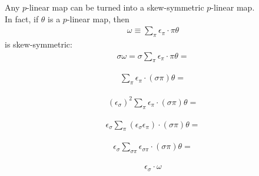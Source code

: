 \documentclass[12pt,a4paper]{article}
\begin{document}
\hspace{1cm} Any $p$-linear map can be turned into a skew-symmetric $p$-linear map.\\ In
fact, if $\theta$ is a $p$-linear map, then
\begin{align*}
\omega \equiv \sum_\pi \epsilon_\pi \cdot \pi \theta
\end{align*}
is skew-symmetric:
\begin{align*}
\sigma \omega = \sigma \sum_\pi \epsilon_\pi \cdot \pi \theta =
\end{align*}

\begin{align*}
 \sum_\pi \epsilon_\pi \cdot (\sigma \pi) \theta =
\end{align*}

\begin{align*}
(\epsilon_\sigma)^2 \sum_\pi \epsilon_\pi \cdot (\sigma \pi)\theta =
\end{align*}

\begin{align*}
\epsilon_\sigma \sum_\pi (\epsilon_\sigma \epsilon_\pi) \cdot (\sigma \pi)\theta =
\end{align*}

\begin{align*}
\epsilon_\sigma \sum_{\sigma \pi} \epsilon_{\sigma \pi} \cdot (\sigma \pi) \theta =
\end{align*}

\begin{align*}
\epsilon_\sigma \cdot \omega
\end{align*}
\end{document}

